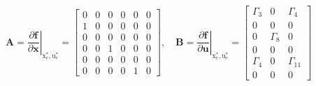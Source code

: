 \documentclass[3p]{elsarticle}
\begin{document}
\begin{equation}
    \mathbf{A} = \left.\dfrac{\partial \mathbf{f}}{\partial \mathbf{x}}\right|_{\boldsymbol{{\mathrm{x}}}_e^*, \boldsymbol{{\mathrm{u}}}_e^*} = \begin{bmatrix}
        0 & 0 & 0 & 0 & 0 & 0 \\
        1 & 0 & 0 & 0 & 0 & 0 \\
        0 & 0 & 0 & 0 & 0 & 0 \\
        0 & 0 & 1 & 0 & 0 & 0 \\
        0 & 0 & 0 & 0 & 0 & 0 \\
        0 & 0 & 0 & 0 & 1 & 0
    \end{bmatrix}, \quad \mathbf{B} = \left.\dfrac{\partial \mathbf{f}}{\partial \mathbf{u}}\right|_{\boldsymbol{{\mathrm{x}}}_e^*, \boldsymbol{{\mathrm{u}}}_e^*} = 
    \begin{bmatrix}
       \Gamma_3 & 0 & \Gamma_4\\
       0 & 0 & 0 \\
       0 & \Gamma_8 & 0 \\
       0 & 0 & 0 \\
       \Gamma_4 & 0 & \Gamma_{11} \\
       0 & 0 & 0
   \end{bmatrix}
\end{equation}
\end{document}
